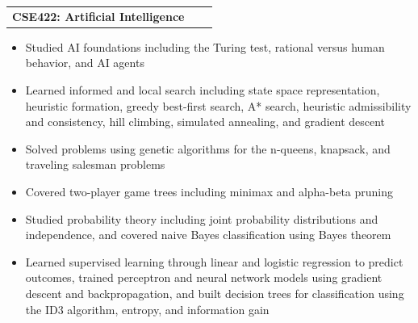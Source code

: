 \documentclass[a4paper,12pt]{article}
\makeatletter
\newenvironment{joblong}[2]
    {
    \begin{tabularx}{\linewidth}{@{}l X r@{}}
    \textbf{#1} & \hfill &  #2 \\[3.75pt]
    \end{tabularx}
    \begin{minipage}[t]{\linewidth}
    \begin{itemize}[nosep,after=\strut, leftmargin=1em, itemsep=3pt,label=--]
    }
    {
    \end{itemize}
    \end{minipage}    
    }
\makeatother
\begin{document}
\begin{joblong}{CSE422: Artificial Intelligence}{}
	\item Studied AI foundations including the Turing test, rational versus human behavior, and AI agents
	\item Learned informed and local search including state space representation, heuristic formation, greedy best-first search, A* search, heuristic admissibility and consistency, hill climbing, simulated annealing, and gradient descent
	\item Solved problems using genetic algorithms for the n-queens, knapsack, and traveling salesman problems
	\item Covered two-player game trees including minimax and alpha-beta pruning
	\item Studied probability theory including joint probability distributions and independence, and covered naive Bayes classification using Bayes theorem
	\item Learned supervised learning through linear and logistic regression to predict outcomes, trained perceptron and neural network models using gradient descent and backpropagation, and built decision trees for classification using the ID3 algorithm, entropy, and information gain
\end{joblong}

\end{document}
